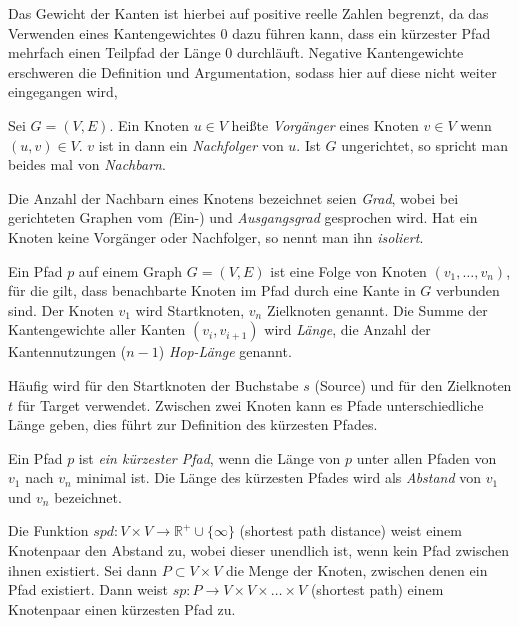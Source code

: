 Das Gewicht der Kanten ist hierbei auf positive reelle Zahlen begrenzt, da das Verwenden eines Kantengewichtes $0$ dazu führen kann, dass ein kürzester Pfad mehrfach einen Teilpfad der Länge 0 durchläuft.
Negative Kantengewichte erschweren die Definition und Argumentation, sodass hier auf diese nicht weiter eingegangen wird,

\begin{definition}[Nachbar]
    Sei $G = (V, E)$. Ein Knoten $u \in V$ heißte \emph{Vorgänger} eines Knoten $v \in V$ wenn $(u, v) \in V$. $v$ ist in dann ein \emph{Nachfolger} von $u$.
    Ist $G$ ungerichtet, so spricht man beides mal von \emph{Nachbarn}.
\end{definition}

Die Anzahl der Nachbarn eines Knotens bezeichnet seien \emph{Grad}, wobei bei gerichteten Graphen vom \emph(Ein-) und \emph{Ausgangsgrad} gesprochen wird.
Hat ein Knoten keine Vorgänger oder Nachfolger, so nennt man ihn \emph{isoliert}.

\begin{definition}[Pfad]
    Ein Pfad $p$ auf einem Graph $G = (V, E)$ ist eine Folge von Knoten $(v_1, \dotsc, v_n)$, für die gilt, dass benachbarte Knoten im Pfad durch eine Kante in $G$ verbunden sind.
    Der Knoten $v_1$ wird Startknoten, $v_n$ Zielknoten genannt.
    Die Summe der Kantengewichte aller Kanten $(v_i, v_{i + 1})$ wird \emph{Länge}, die Anzahl der Kantennutzungen ($n - 1$) \emph{Hop-Länge} genannt.
\end{definition}

Häufig wird für den Startknoten der Buchstabe $s$ (Source) und für den Zielknoten $t$ für Target verwendet.
Zwischen zwei Knoten kann es Pfade unterschiedliche Länge geben, dies führt zur Definition des kürzesten Pfades.

\begin{definition}
    Ein Pfad $p$ ist \emph{ein kürzester Pfad}, wenn die Länge von $p$ unter allen Pfaden von $v_1$ nach $v_n$ minimal ist.
    Die Länge des kürzesten Pfades wird als \emph{Abstand} von $v_1$ und $v_n$ bezeichnet.

    Die Funktion ${spd} \colon V \times V \to \mathbb{R}^+ \cup \{ \infty \} $ (shortest path distance) weist einem Knotenpaar den Abstand zu, wobei dieser unendlich ist, wenn kein Pfad zwischen ihnen existiert.
    Sei dann $P \subset V \times V$ die Menge der Knoten, zwischen denen ein Pfad existiert.
    Dann weist ${sp} \colon P \to V \times V \times \dots \times V$ (shortest path) einem Knotenpaar einen kürzesten Pfad zu.
\end{definition}

